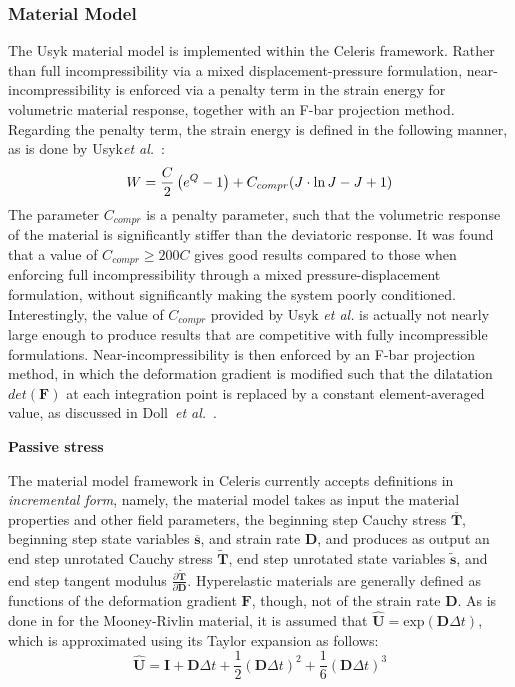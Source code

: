 \subsubsection{Material Model}
The Usyk material model is implemented within the Celeris framework. Rather than full incompressibility via a mixed displacement-pressure formulation, near-incompressibility is enforced via a penalty term in the strain energy for volumetric material response, together with an F-bar projection method. Regarding the penalty term, the strain energy is defined in the following manner, as is done by Usyk\textit{et al.}~\cite{usyk_2002}:
\begin{equation}
W = \frac{C}{2}\left(e^Q -1\right) + C_{compr} (J \cdot \ln J - J + 1) \\
\end{equation}
The parameter $C_{compr}$ is a penalty parameter, such that the volumetric response of the material is significantly stiffer than the deviatoric response. It was found that a value of $C_{compr} \geq 200  C$ gives good results compared to those when enforcing full incompressibility through a mixed pressure-displacement formulation, without significantly making the system poorly conditioned. Interestingly, the value of $C_{compr}$ provided by Usyk \textit{et al.} is actually not nearly large enough to produce results that are competitive with fully incompressible formulations. Near-incompressibility is then enforced by an F-bar projection method, in which the deformation gradient is modified such that the dilatation $det(\bm{F})$ at each integration point is replaced by a constant element-averaged value, as discussed in Doll~\textit{et al.}~\cite{doll_2000}.

\textbf{Passive stress}

The material model framework in Celeris currently accepts definitions in \textit{incremental form}, namely, the material model takes as input the material properties and other field parameters, the beginning step Cauchy stress $\overline{\bm{T}}$, beginning step state variables $\overline{\bm{s}}$, and strain rate $\bm{D}$, and produces as output an end step unrotated Cauchy stress $\tilde{\bm{T}}$, end step unrotated state variables $\tilde{\bm{s}}$, and end step tangent modulus $\frac{\partial \tilde{\bm{T}}}{\partial \bm{D}}$. Hyperelastic materials are generally defined as functions of the deformation gradient $\bm{F}$, though, not of the strain rate $\bm{D}$. As is done in  for the Mooney-Rivlin material, it is assumed that $\hat{\bm{U}} = \text{exp}(\bm{D}\Delta{t})$, which is approximated using its Taylor expansion as follows:
\begin{equation}
\hat{\bm{U}} = \bm{I} + \bm{D}\Delta{t} + \frac{1}{2}(\bm{D}\Delta{t})^2 + \frac{1}{6}(\bm{D}\Delta{t})^3
\end{equation}

